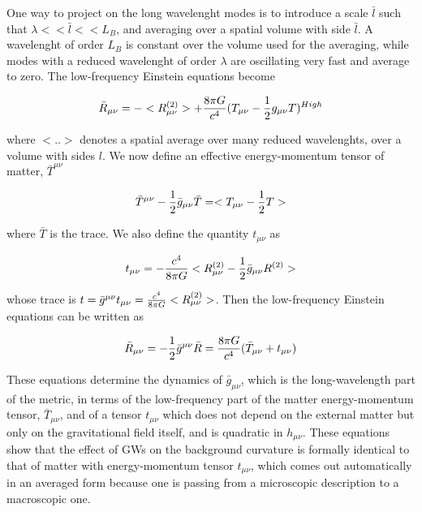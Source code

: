 \documentclass[binding=0.6cm, LaM]{sapthesis}
\begin{document}
	One way to project on the long wavelenght modes is to introduce a scale $\bar l$ such that $\lambda << \bar l << L_B$, 
	and averaging over a spatial volume with side $\bar l$.
	A wavelenght of order $L_B$ is constant over the volume used for the averaging, 
	while modes with a reduced wavelenght of order $\lambda$ are oscillating very fast and average to zero.
	The low-frequency Einstein equations become

		\begin{equation}
 		{\bar R_{\mu\nu}} = - <R_{\mu\nu}^{(2)}> +  {{8\pi G}\over c^4}(T_{\mu\nu}- {1 \over 2}g_{\mu\nu}T) ^{High}
		\end{equation}

	where $<..>$ denotes a spatial average over many reduced wavelenghts, over a volume with sides $l$.
	We now define an effective energy-momentum tensor of matter, $\bar T^{\mu\nu}$

		\begin{equation}
		{\bar T^{\mu\nu}} - {1 \over 2}{\bar g_{\mu\nu}}{\bar T} = <T_{\mu\nu}- {1 \over 2}T>
		\end{equation}

	where ${\bar T}$ is the trace.
	We also define the quantity $t_{\mu\nu}$ as

		\begin{equation}
		t_{\mu\nu} = -{{c^4}\over{8\pi G}}<R_{\mu\nu}^{(2)} - {1 \over 2}{\bar g_{\mu \nu}}R^{(2)}>
		\end{equation}

	whose trace is $t= {\bar g^{\mu\nu}}t_{\mu\nu} = {{c^4}\over{8\pi G}}<R_{\mu\nu}^{(2)}>$.
	Then the low-frequency Einstein equations can be written as

		\begin{equation}
		 {\bar R_{\mu\nu}} = -{1 \over 2}{\bar g^{\mu\nu}} {\bar R} =  {{8\pi G}\over c^4}({\bar T_{\mu\nu}}+t_{\mu\nu})
		\end{equation}

	These equations determine the dynamics of $\bar g_{\mu\nu}$, which is the long-wavelength part of the metric, 
	in terms of the low-frequency part of the matter energy-momentum tensor, $\bar T_{\mu\nu}$, 
	and of a tensor $t_{\mu\nu}$ which does not depend on the external matter but only on the gravitational field itself, 
	and is quadratic in $h_{\mu\nu}$.
	These equations show that the effect of GWs on the background curvature is formally identical to that of matter 
	with energy-momentum tensor $t_{\mu\nu}$, which comes out automatically in an averaged form because 
	one is passing from a microscopic description to a macroscopic one.
\end{document}
